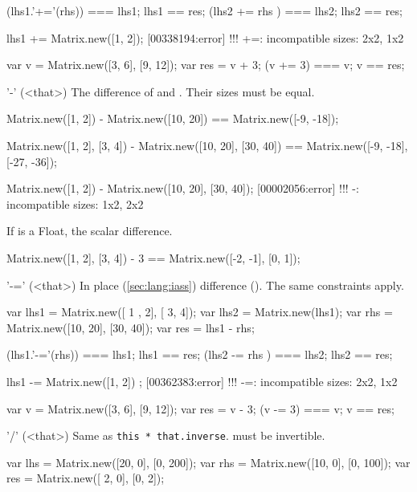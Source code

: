 \begin{urbiscriptapi}
\begin{urbiassert}
(lhs1.'+='(rhs)) === lhs1;  lhs1 == res;
(lhs2  +=  rhs ) === lhs2;  lhs2 == res;

lhs1 += Matrix.new([1, 2]);
[00338194:error] !!! +=: incompatible sizes: 2x2, 1x2
\end{urbiassert}

\begin{urbiassert}
var v = Matrix.new([3, 6], [9, 12]);
var res = v + 3;
(v += 3) === v; v == res;
\end{urbiassert}


\item['-'](<that>)%
  The difference of \this and \that.  Their sizes must be equal.
\begin{urbiassert}
Matrix.new([1, 2]) - Matrix.new([10, 20])
  == Matrix.new([-9, -18]);

Matrix.new([1, 2], [3, 4]) - Matrix.new([10, 20], [30, 40])
  == Matrix.new([-9, -18], [-27, -36]);

Matrix.new([1, 2]) - Matrix.new([10, 20], [30, 40]);
[00002056:error] !!! -: incompatible sizes: 1x2, 2x2
\end{urbiassert}

  If \that is a Float, the scalar difference.
\begin{urbiassert}
Matrix.new([1, 2], [3, 4]) - 3 == Matrix.new([-2, -1], [0, 1]);
\end{urbiassert}



\item['-='](<that>)%
  In place (\autoref{sec:lang:iass}) difference ().  The same
  constraints apply.
\begin{urbiassert}
var lhs1 = Matrix.new([ 1 , 2], [ 3,  4]);
var lhs2 = Matrix.new(lhs1);
var rhs = Matrix.new([10, 20], [30, 40]);
var res = lhs1 - rhs;

(lhs1.'-='(rhs)) === lhs1;  lhs1 == res;
(lhs2  -=  rhs ) === lhs2;  lhs2 == res;

lhs1 -= Matrix.new([1, 2]) ;
[00362383:error] !!! -=: incompatible sizes: 2x2, 1x2
\end{urbiassert}

\begin{urbiassert}
var v = Matrix.new([3, 6], [9, 12]);
var res = v - 3;
(v -= 3) === v; v == res;
\end{urbiassert}


\item['/'](<that>)%
  Same as \lstinline|this * that.inverse|.  \that must be invertible.
\begin{urbiassert}
var lhs = Matrix.new([20, 0], [0, 200]);
var rhs = Matrix.new([10, 0], [0, 100]);
var res = Matrix.new([ 2, 0], [0,   2]);


\end{urbiassert}
\end{urbiscriptapi}
